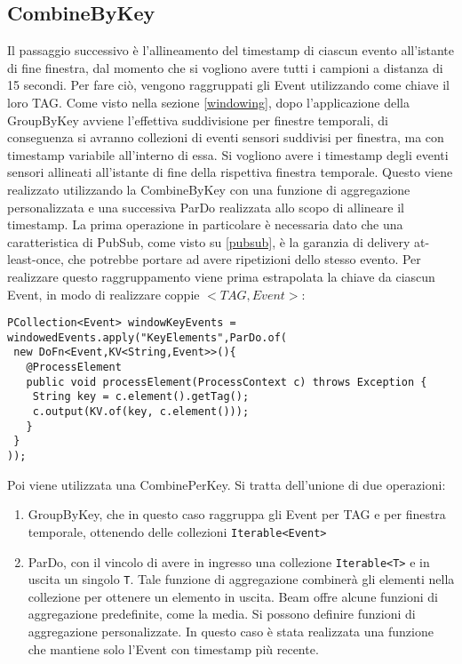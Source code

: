 \subsection{CombineByKey}
Il passaggio successivo è l'allineamento del timestamp di ciascun evento all'istante di fine finestra, dal momento che si vogliono avere tutti i campioni a distanza di 15 secondi. Per fare ciò, vengono raggruppati gli Event utilizzando come chiave il loro TAG. Come visto nella sezione \ref{windowing}, dopo l'applicazione della GroupByKey avviene l'effettiva suddivisione per finestre temporali, di conseguenza si avranno collezioni di eventi sensori suddivisi per finestra, ma con timestamp variabile all'interno di essa. Si vogliono avere i timestamp degli eventi sensori allineati all'istante di fine della rispettiva finestra temporale. Questo viene realizzato utilizzando la CombineByKey con una funzione di aggregazione personalizzata e una successiva ParDo realizzata allo scopo di allineare il timestamp.
La prima operazione in particolare è necessaria dato che una caratteristica di PubSub, come visto su \ref{pubsub}, è la garanzia di delivery at-least-once, che potrebbe portare ad avere ripetizioni dello stesso evento.
Per realizzare questo raggruppamento viene prima estrapolata la chiave da ciascun Event, in modo di realizzare coppie $ <TAG,Event> $:
\begin{lstlisting}
PCollection<Event> windowKeyEvents =
windowedEvents.apply("KeyElements",ParDo.of(
 new DoFn<Event,KV<String,Event>>(){
   @ProcessElement
   public void processElement(ProcessContext c) throws Exception {
    String key = c.element().getTag();
    c.output(KV.of(key, c.element()));
   }
 }
));
\end{lstlisting} 
Poi viene utilizzata una CombinePerKey. Si tratta dell'unione di due operazioni:
\begin{enumerate}
	\item GroupByKey, che in questo caso raggruppa gli Event per TAG e per finestra temporale, ottenendo delle collezioni \texttt{Iterable<Event>}
	\item ParDo, con il vincolo di avere in ingresso una collezione \texttt{Iterable<T>} e in uscita un singolo \texttt{T}. Tale funzione di aggregazione combinerà gli elementi nella collezione per ottenere un elemento in uscita. Beam offre alcune funzioni di aggregazione predefinite, come la media. Si possono definire funzioni di aggregazione personalizzate. In questo caso è stata realizzata una funzione che mantiene solo l'Event con timestamp più recente.
\end{enumerate}
